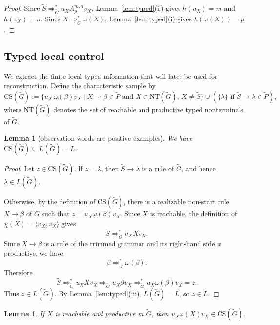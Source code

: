 \documentclass[11pt,a4paper]{article}
\newtheorem{lemma}[theorem]{Lemma}
\newcommand{\CS}{\mathrm{CS}}
\begin{document}
\begin{proof}
Since $\widetilde S\Rightarrow_{\widetilde G}^*u_XA_p^{m,n}v_X$,
Lemma~\ref{lem:typed}\textup{(ii)} gives $h(u_X)=m$ and $h(v_X)=n$.
Since $X\Rightarrow_{\widetilde G}^*\omega(X)$,
Lemma~\ref{lem:typed}\textup{(i)} gives $h(\omega(X))=p$.
\end{proof}

\subsection{Typed local control}\label{subsec:typed-local-control}

We extract the finite local typed information that will later be used for reconstruction. Define the characteristic sample by
\[
\CS(\widetilde G):=\{u_X\,\omega(\beta)v_X\mid X\to\beta\in\widetilde P\text{ and }X\in\mathrm{NT}(\widetilde G),\ X\neq\widetilde S\}\cup(\{\lambda\}\text{ if }\widetilde S\to\lambda\in\widetilde P),
\]
where $\mathrm{NT}(\widetilde G)$ denotes the set of reachable and productive typed nonterminals of $\widetilde G$.

\begin{lemma}[observation words are positive examples]
\label{lem:cs-contained-in-language}
We have $\CS(\widetilde G)\subseteq L(\widetilde G)=L$.
\end{lemma}

\begin{proof}
Let $z\in\CS(\widetilde G)$. If $z=\lambda$, then
$\widetilde S\to\lambda$ is a rule of $\widetilde G$, and hence
$\lambda\in L(\widetilde G)$.

Otherwise, by the definition of $\CS(\widetilde G)$, there is a
realizable non-start rule $X\to\beta$ of $\widetilde G$ such that
$z=u_X\omega(\beta)v_X$. Since $X$ is reachable, the definition of
$\chi(X)=\langle u_X,v_X\rangle$ gives
\[
  \widetilde S\Rightarrow_{\widetilde G}^* u_X X v_X .
\]
Since \(X\to\beta\) is a rule of the trimmed grammar and its right-hand
side is productive, we have
\[
  \beta\Rightarrow_{\widetilde G}^*\omega(\beta).
\]
Therefore
\[
  \widetilde S
  \Rightarrow_{\widetilde G}^* u_X X v_X
  \Rightarrow_{\widetilde G} u_X\beta v_X
  \Rightarrow_{\widetilde G}^* u_X\omega(\beta)v_X=z .
\]
Thus $z\in L(\widetilde G)$. By Lemma~\ref{lem:typed}\textup{(iii)},
$L(\widetilde G)=L$, so $z\in L$.
\end{proof}


\begin{lemma}\label{lem:typed-cs}
If $X$ is reachable and productive in $\widetilde G$, then $u_X\omega(X)v_X\in\CS(\widetilde G)$.
\end{lemma}
\end{document}

